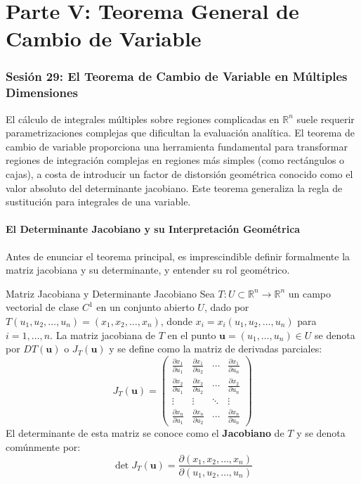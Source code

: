\documentclass[11pt,a4paper]{article}
\begin{document}
\part*{Parte V: Teorema General de Cambio de Variable}

\section*{Sesión 29: El Teorema de Cambio de Variable en Múltiples Dimensiones}

El cálculo de integrales múltiples sobre regiones complicadas en $\mathbb{R}^n$ suele requerir parametrizaciones complejas que dificultan la evaluación analítica. El teorema de cambio de variable proporciona una herramienta fundamental para transformar regiones de integración complejas en regiones más simples (como rectángulos o cajas), a costa de introducir un factor de distorsión geométrica conocido como el valor absoluto del determinante jacobiano. Este teorema generaliza la regla de sustitución para integrales de una variable.

\subsection*{El Determinante Jacobiano y su Interpretación Geométrica}

Antes de enunciar el teorema principal, es imprescindible definir formalmente la matriz jacobiana y su determinante, y entender su rol geométrico.

\begin{definicionbox}{Matriz Jacobiana y Determinante Jacobiano}
Sea $T: U \subset \mathbb{R}^n \to \mathbb{R}^n$ un campo vectorial de clase $C^1$ en un conjunto abierto $U$, dado por $T(u_1, u_2, \dots, u_n) = (x_1, x_2, \dots, x_n)$, donde $x_i = x_i(u_1, u_2, \dots, u_n)$ para $i=1, \dots, n$. La matriz jacobiana de $T$ en el punto $\mathbf{u} = (u_1, \dots, u_n) \in U$ se denota por $DT(\mathbf{u})$ o $J_T(\mathbf{u})$ y se define como la matriz de derivadas parciales:
\begin{equation*}
J_T(\mathbf{u}) = \begin{pmatrix}
\frac{\partial x_1}{\partial u_1} & \frac{\partial x_1}{\partial u_2} & \cdots & \frac{\partial x_1}{\partial u_n} \\
\frac{\partial x_2}{\partial u_1} & \frac{\partial x_2}{\partial u_2} & \cdots & \frac{\partial x_2}{\partial u_n} \\
\vdots & \vdots & \ddots & \vdots \\
\frac{\partial x_n}{\partial u_1} & \frac{\partial x_n}{\partial u_2} & \cdots & \frac{\partial x_n}{\partial u_n}
\end{pmatrix}
\end{equation*}
El determinante de esta matriz se conoce como el \textbf{Jacobiano} de $T$ y se denota comúnmente por:
\begin{equation*}
\det J_T(\mathbf{u}) = \frac{\partial(x_1, x_2, \dots, x_n)}{\partial(u_1, u_2, \dots, u_n)}
\end{equation*}
\end{definicionbox}
\end{document}
